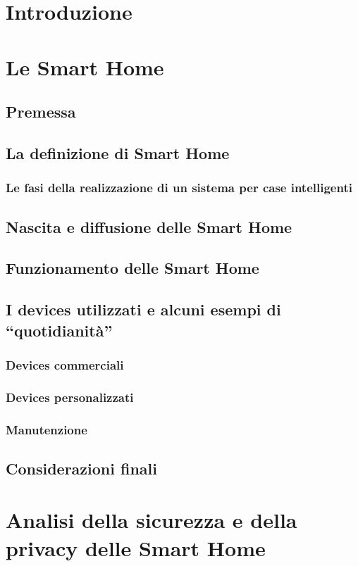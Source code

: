 \documentclass{article}
\begin{document}
\maketitle
\newpage
\tableofcontents
\thispagestyle{empty}
\newpage

\section{Introduzione}

\newpage
\section{Le Smart Home}

\subsection{Premessa}

\subsection{La definizione di Smart Home}

\subsubsection{Le fasi della realizzazione di un sistema per case intelligenti}

\subsection{Nascita e diffusione delle Smart Home}

\subsection{Funzionamento delle Smart Home}

\subsection{I devices utilizzati e alcuni esempi di “quotidianità”}

\subsubsection{Devices commerciali}

\subsubsection{Devices personalizzati}

\subsubsection{Manutenzione}

\subsection{Considerazioni finali}

\section{Analisi della sicurezza e della privacy delle Smart Home}
\end{document}
